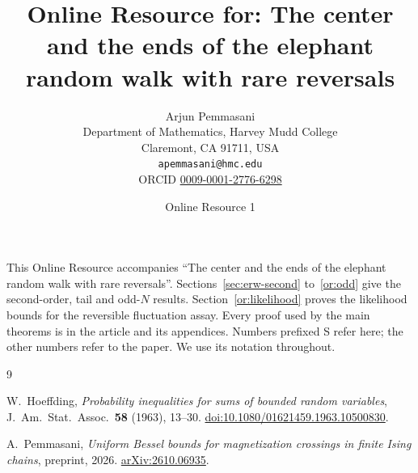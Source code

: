 \documentclass[11pt]{article}
\title{Online Resource for: The center and the ends of the elephant random walk with rare reversals}
\author{Arjun Pemmasani\\[2pt]
\small Department of Mathematics, Harvey Mudd College\\
\small Claremont, CA 91711, USA\\
\small \texttt{apemmasani@hmc.edu}\\
\small ORCID \href{https://orcid.org/0009-0001-2776-6298}{0009-0001-2776-6298}}
\date{Online Resource 1}
\theoremstyle{definition}
\theoremstyle{remark}
\begin{document}
\maketitle

This Online Resource accompanies ``The center and the ends of the
elephant random walk with rare reversals''.
Sections~\ref{sec:erw-second} to~\ref{or:odd} give the second-order,
tail and odd-$N$ results. Section~\ref{or:likelihood} proves the
likelihood bounds for the reversible fluctuation assay. Every proof
used by the main theorems is in the article and its appendices.
Numbers prefixed S refer here; the other numbers refer to the paper.
We use its notation throughout.



\begin{thebibliography}{9}\small

W.~Hoeffding, \emph{Probability inequalities for sums of bounded random
variables}, J.\ Am.\ Stat.\ Assoc.\ \textbf{58} (1963), 13--30.
\href{https://doi.org/10.1080/01621459.1963.10500830}{doi:10.1080/01621459.1963.10500830}.

A.~Pemmasani, \emph{Uniform Bessel bounds for magnetization crossings in
finite Ising chains}, preprint, 2026.
\href{https://arxiv.org/abs/2610.06935}{arXiv:2610.06935}.



\end{thebibliography}
\end{document}
